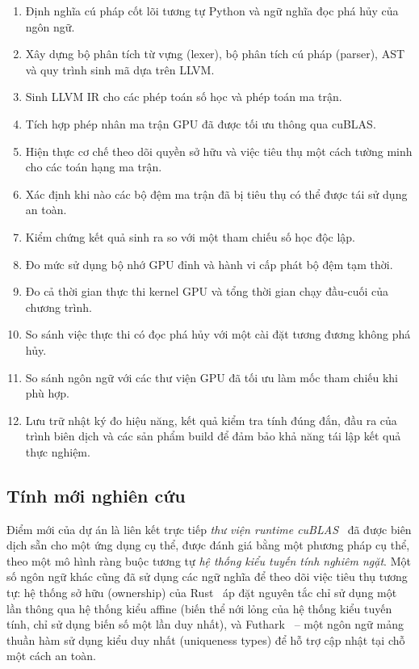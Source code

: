 \documentclass[a4paper]{article}
\begin{document}
	\begin{enumerate}
		\item Định nghĩa cú pháp cốt lõi tương tự Python và ngữ nghĩa đọc phá hủy của ngôn ngữ.
		\item Xây dựng bộ phân tích từ vựng (lexer), bộ phân tích cú pháp (parser), AST và quy trình sinh mã dựa trên LLVM.
		\item Sinh LLVM IR cho các phép toán số học và phép toán ma trận.
		\item Tích hợp phép nhân ma trận GPU đã được tối ưu thông qua cuBLAS.
		\item Hiện thực cơ chế theo dõi quyền sở hữu và việc tiêu thụ một cách tường minh cho các toán hạng ma trận.
		\item Xác định khi nào các bộ đệm ma trận đã bị tiêu thụ có thể được tái sử dụng an toàn.
		\item Kiểm chứng kết quả sinh ra so với một tham chiếu số học độc lập.
		\item Đo mức sử dụng bộ nhớ GPU đỉnh và hành vi cấp phát bộ đệm tạm thời.
		\item Đo cả thời gian thực thi kernel GPU và tổng thời gian chạy đầu-cuối của chương trình.
		\item So sánh việc thực thi có đọc phá hủy với một cài đặt tương đương không phá hủy.
		\item So sánh ngôn ngữ với các thư viện GPU đã tối ưu làm mốc tham chiếu khi phù hợp.
		\item Lưu trữ nhật ký đo hiệu năng, kết quả kiểm tra tính đúng đắn, đầu ra của trình biên dịch và các sản phẩm build để đảm bảo khả năng tái lập kết quả thực nghiệm.
	\end{enumerate}
	
	\subsection{Tính mới nghiên cứu}
	
	Điểm mới của dự án là liên kết trực tiếp \emph{thư viện runtime cuBLAS}~\cite{cublas} đã được biên dịch sẵn cho một ứng dụng cụ thể, được đánh giá bằng một phương pháp cụ thể, theo một mô hình ràng buộc tương tự \emph{hệ thống kiểu tuyến tính nghiêm ngặt}. Một số ngôn ngữ khác cũng đã sử dụng các ngữ nghĩa để theo dõi việc tiêu thụ tương tự: hệ thống sở hữu (ownership) của Rust~\cite{rust} áp đặt nguyên tắc chỉ sử dụng một lần thông qua hệ thống kiểu affine (biến thể nới lỏng của hệ thống kiểu tuyến tính, chỉ sử dụng biến số một lần duy nhất), và Futhark~\cite{futhark} -- một ngôn ngữ mảng thuần hàm sử dụng kiểu duy nhất (uniqueness types) để hỗ trợ cập nhật tại chỗ một cách an toàn.
	
\end{document}
